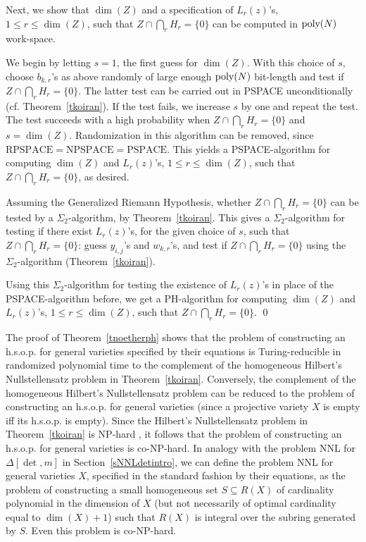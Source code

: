 \documentclass[11pt]{article}
\begin{document}
Next, we show  that $\dim(Z)$ and a  specification of  $L_r(z)$'s, $1 \le r \le \dim(Z)$, 
such that $Z\cap \bigcap_{r} H_r = \{0\}$ can be computed in ${\mbox {poly}}(N)$ work-space.


We begin by letting $s=1$, the first guess for $\dim(Z)$.
With this choice of $s$, 
choose $b_{k,r}$'s as above randomly of large enough 
${\mbox {poly}}(N)$ bit-length and  test if $Z \cap \bigcap_r H_r = \{0\}$. The latter test  can be carried out in PSPACE unconditionally (cf. Theorem~\ref{tkoiran}).
If the test fails, we increase $s$ by one and repeat the test.
The test succeeds with a high probability when 
$Z \cap \bigcap_r H_r = \{0\}$ and $s=\dim(Z)$.
Randomization in this algorithm can be removed, since $\mbox{RPSPACE}=\mbox{NPSPACE}=\mbox{PSPACE}$. 
This yields a PSPACE-algorithm for computing $\dim(Z)$ and $L_r(z)$'s, $1\le r \le \dim(Z)$,
such that $Z \cap \bigcap_r H_r = \{0\}$, as desired.

Assuming the Generalized Riemann Hypothesis, 
whether $Z \cap \bigcap_r H_r = \{0\}$  can be tested  by a $\Sigma_2$-algorithm, by Theorem~\ref{tkoiran}. 
This gives a  $\Sigma_2$-algorithm for testing if there exist
$L_r(z)$'s, for the given choice of $s$, such that $Z \cap \bigcap_r H_r = \{0\}$: 
guess $y_{i,j}$'s and $w_{k,r}$'s, and  test 
if $Z \cap \bigcap_r H_r = \{0\}$ using
the $\Sigma_2$-algorithm (Theorem~\ref{tkoiran}). 

Using this $\Sigma_2$-algorithm for testing the existence of $L_r(z)$'s in place of the
PSPACE-algorithm before, we get a PH-algorithm for computing $\dim(Z)$
and  $L_r(z)$'s, $1 \le r \le \dim(Z)$,  such that $Z \cap \bigcap_r H_r = \{0\}$.
\qed


The proof of Theorem~\ref{tnoetherph}  shows that the problem of constructing an 
h.s.o.p.  for general varieties specified by their equations is Turing-reducible in randomized 
polynomial time to the complement of 
the homogeneous Hilbert's Nullstellensatz problem in Theorem~\ref{tkoiran}.
Conversely, the complement of the 
homogeneous Hilbert's Nullstellensatz problem
can be reduced to the
problem of constructing an h.s.o.p.  for general varieties (since a projective variety $X$ is
empty iff its h.s.o.p.   is empty).
Since the Hilbert's Nullstellensatz  problem in Theorem~\ref{tkoiran}
is NP-hard \cite{portier}, 
it follows that the problem of constructing an h.s.o.p.
for general varieties is co-NP-hard. 
In analogy with the problem NNL for $\Delta[\det,m]$ in Section~\ref{sNNLdetintro}, we can define the problem NNL for general varieties
$X$, specified in the standard fashion by their  equations, as the problem of constructing a small homogeneous set $S \subseteq R(X)$
of cardinality polynomial in the dimension of $X$ (but not necessarily of optimal cardinality equal to $\dim(X)+1$) such that
$R(X)$ is integral over the subring generated by $S$. Even this problem is  co-NP-hard. 
\end{document}
